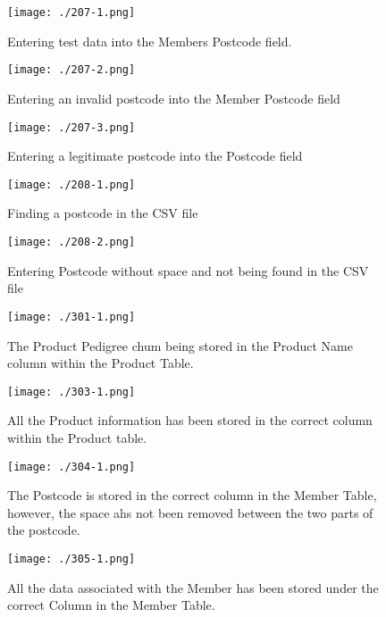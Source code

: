 \begin{figure}[H]
    \texttt{[image: ./207-1.png]}
    \caption{Entering test data into the Members Postcode field.} \label{fig:207-1}
\end{figure}

\begin{figure}[H]
    \texttt{[image: ./207-2.png]}
    \caption{Entering an invalid postcode into the Member Postcode field} \label{fig:207-2}
\end{figure}

\begin{figure}[H]
    \texttt{[image: ./207-3.png]}
    \caption{Entering a legitimate postcode into the Postcode field} \label{fig:207-3}
\end{figure}

\begin{figure}[H]
    \texttt{[image: ./208-1.png]}
    \caption{Finding a postcode in the CSV file} \label{fig:208-1}
\end{figure}

\begin{figure}[H]
    \texttt{[image: ./208-2.png]}
    \caption{Entering Postcode without space and not being found in the CSV file} \label{fig:208-2}
\end{figure}

\begin{figure}[H]
    \texttt{[image: ./301-1.png]}
    \caption{The Product Pedigree chum being stored in the Product Name column within the Product Table.} \label{fig:301-1}
\end{figure}

\begin{figure}[H]
    \texttt{[image: ./303-1.png]}
    \caption{All the Product information has been stored in the correct column within the Product table.} \label{fig:303-1}
\end{figure}

\begin{figure}[H]
    \texttt{[image: ./304-1.png]}
    \caption{The Postcode is stored in the correct column in the Member Table, however, the space ahs not been removed between the two parts of the postcode.} \label{fig:304-1}
\end{figure}

\begin{figure}[H]
    \texttt{[image: ./305-1.png]}
    \caption{All the data associated with the Member has been stored under the correct Column in the Member Table.} \label{fig:305-1}
\end{figure}

